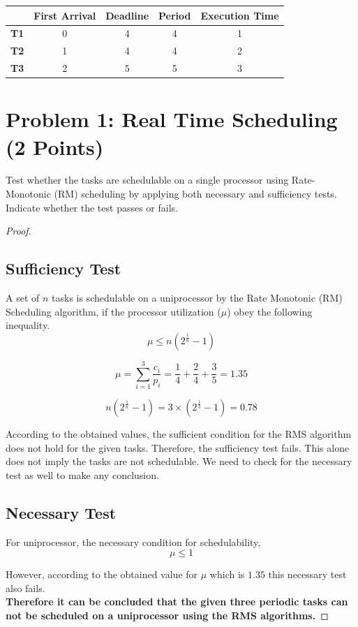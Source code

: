 \documentclass[11pt,letterpaper]{article}
\begin{document}
	\begin{table}[h]
		\centering
		\begin{tabular}{|c|c|c|c|c|}
			\hline
			& \textbf{First Arrival} & \textbf{Deadline} & \textbf{Period} & \textbf{Execution Time} \\ \hline
			\textbf{T1} & 0                      & 4                 & 4               & 1                       \\ \hline
			\textbf{T2} & 1                      & 4                 & 4               & 2                       \\ \hline
			\textbf{T3} & 2                      & 5                & 5              & 3                       \\ \hline
		\end{tabular}
	\end{table}
	
	\section*{Problem 1: Real Time Scheduling (2 Points)}
	
	Test whether the tasks are schedulable on a single processor using Rate-Monotonic (RM) scheduling by applying both necessary and sufficiency tests. Indicate whether the test passes or fails.
	
	\begin{proof}
		
	
	\subsection*{Sufficiency Test}
	A set of $n$ tasks is schedulable on a uniprocessor by the Rate Monotonic (RM) Scheduling algorithm, if the processor utilization ($\mu$) obey the following inequality.
	\[	\mu \le n\left(2^{\frac{1}{n}} - 1\right) \]
	
	\[
	\mu  	
	= \sum_{i=1}^{3} \frac{c_i}{p_i}
	= \frac{1}{4} + \frac{2}{4} + \frac{3}{5}
	= 1.35
	\]
	
	\[
	n\left(2^{\frac{1}{n}} - 1\right)
	 = 3 \times \left(2^{\frac{1}{3}} - 1\right)
	 = 0.78
	\]
	
According to the obtained values, the sufficient condition for the RMS algorithm does not hold for the given tasks. Therefore, the sufficiency test fails. This alone does not imply the tasks are not schedulable. We need to check for the necessary test as well to make any conclusion.


\subsection*{Necessary Test}
For uniprocessor, the necessary condition for schedulability,
\[\mu \le 1\]

However, according to the obtained value for $\mu$ which is $1.35$ this necessary test also fails.\\

\textbf{Therefore it can be concluded that the given three periodic tasks can not be scheduled on a uniprocessor using the RMS algorithms.}
\end{proof}
	\newpage
\end{document}
